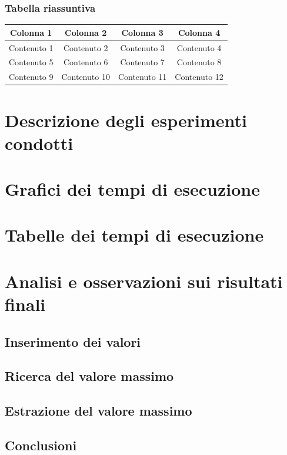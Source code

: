 \documentclass{article}
\begin{document}
\subsubsection{Tabella riassuntiva}

\begin{tabular}{cccc}
  \toprule
  Colonna 1 & Colonna 2 & Colonna 3 & Colonna 4 \\
  \midrule
  Contenuto 1 & Contenuto 2 & Contenuto 3 & Contenuto 4 \\
  \hdashline
  Contenuto 5 & Contenuto 6 & Contenuto 7 & Contenuto 8 \\
  \hdashline
  Contenuto 9 & Contenuto 10 & Contenuto 11 & Contenuto 12 \\
  \bottomrule
\end{tabular}


\clearpage

\section{Descrizione degli esperimenti condotti}

\clearpage

\section{Grafici dei tempi di esecuzione}

\clearpage

\section{Tabelle dei tempi di esecuzione}

\clearpage

\section{Analisi e osservazioni sui risultati finali}

\subsection{Inserimento dei valori}

\subsection{Ricerca del valore massimo}

\subsection{Estrazione del valore massimo}

\subsection{Conclusioni}
\end{document}

